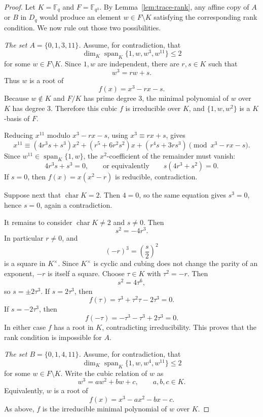 \documentclass[11pt,letterpaper]{amsart}
\theoremstyle{plain}
\newcommand{\F}{\mathbb F}
\newcommand{\Span}{\operatorname{span}}
\begin{document}
\begin{proof}
Let \(K=\F_q\) and \(F=\F_{q^3}\).  By
Lemma~\ref{lem:trace-rank}, any affine copy of \(A\) or \(B\) in
\(D_q\) would produce an element \(w\in F\setminus K\) satisfying the
corresponding rank condition.  We now rule out those two possibilities.

\smallskip
\noindent\emph{The set \(A=\{0,1,3,11\}\).}
Assume, for contradiction, that
\[
 \dim_K\Span_K\{1,w,w^3,w^{11}\}\leq 2
\]
for some \(w\in F\setminus K\).  Since \(1,w\) are independent, there
are \(r,s\in K\) such that
\[
 w^3=rw+s.
\]
Thus \(w\) is a root of
\[
 f(x)=x^3-rx-s.
\]
Because \(w\notin K\) and \(F/K\) has prime degree \(3\), the minimal
polynomial of \(w\) over \(K\) has degree \(3\).  Therefore this cubic
\(f\) is irreducible over \(K\), and \(\{1,w,w^2\}\) is a \(K\)-basis
of \(F\).

Reducing \(x^{11}\) modulo \(x^3-rx-s\), using \(x^3\equiv rx+s\), gives
\[
 x^{11}\equiv
 (4r^3s+s^3)x^2+(r^5+6r^2s^2)x+(r^4s+3rs^3)
 \pmod{x^3-rx-s}.
\]
Since \(w^{11}\in\Span_K\{1,w\}\), the \(x^2\)-coefficient of the
remainder must vanish:
\[
 4r^3s+s^3=0,
 \qquad\text{or equivalently}\qquad
 s(4r^3+s^2)=0.
\]
If \(s=0\), then \(f(x)=x(x^2-r)\) is reducible, contradiction.

Suppose next that \(\operatorname{char}K=2\).  Then \(4=0\), so the
same equation gives \(s^3=0\), hence \(s=0\), again a contradiction.

It remains to consider \(\operatorname{char}K\ne 2\) and \(s\ne 0\).
Then
\[
 s^2=-4r^3.
\]
In particular \(r\ne 0\), and
\[
 (-r)^3=\left(\frac{s}{2}\right)^2
\]
is a square in \(K^\times\).  Since \(K^\times\) is cyclic and cubing
does not change the parity of an exponent, \(-r\) is itself a square.
Choose \(\tau\in K\) with \(\tau^2=-r\).  Then
\[
 s^2=4\tau^6,
\]
so \(s=\pm 2\tau^3\).  If \(s=2\tau^3\), then
\[
 f(\tau)=\tau^3+\tau^2\tau-2\tau^3=0.
\]
If \(s=-2\tau^3\), then
\[
 f(-\tau)=-\tau^3-\tau^3+2\tau^3=0.
\]
In either case \(f\) has a root in \(K\), contradicting irreducibility.
This proves that the rank condition is impossible for \(A\).

\smallskip
\noindent\emph{The set \(B=\{0,1,4,11\}\).}
Assume, for contradiction, that
\[
 \dim_K\Span_K\{1,w,w^4,w^{11}\}\leq 2
\]
for some \(w\in F\setminus K\).  Write the cubic relation of \(w\) as
\[
 w^3=aw^2+bw+c,\qquad a,b,c\in K.
\]
Equivalently, \(w\) is a root of
\[
 f(x)=x^3-ax^2-bx-c.
\]
As above, \(f\) is the irreducible minimal polynomial of \(w\) over
\(K\).


\end{proof}
\end{document}
